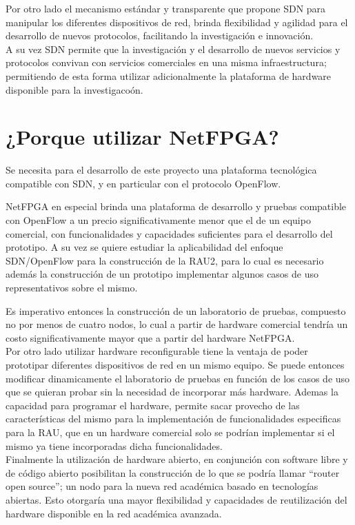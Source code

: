 Por otro lado el mecanismo estándar y transparente que propone SDN para manipular los diferentes dispositivos de red, brinda flexibilidad y agilidad para el desarrollo de nuevos protocolos, facilitando la investigaci\'on e innovaci\'on.\\

A su vez SDN permite que la investigaci\'on y el desarrollo de nuevos servicios y protocolos convivan con servicios comerciales en una misma infraestructura; permitiendo de esta forma utilizar adicionalmente la plataforma de hardware disponible para la investigaco\'on. 


\section[¿Porque utilizar NetFPGA?]{¿Porque utilizar NetFPGA?}

Se necesita para el desarrollo de este proyecto una plataforma tecnol\'ogica compatible con SDN, y en particular con el protocolo OpenFlow.

NetFPGA en especial brinda una plataforma de desarrollo y pruebas compatible con OpenFlow a un precio significativamente menor que el de un equipo comercial, con funcionalidades y capacidades suficientes para el desarrollo del prototipo. A su vez se quiere estudiar la aplicabilidad del enfoque SDN/OpenFlow para la construcción de la RAU2, para lo cual es necesario adem\'as la construcción de un prototipo implementar algunos casos de uso representativos sobre el mismo. 

Es imperativo entonces la construcción de un laboratorio de pruebas, compuesto no por menos de cuatro nodos, lo cual a partir de hardware comercial tendría un costo significativamente mayor que a partir del hardware NetFPGA.\\

Por otro lado utilizar hardware reconfigurable tiene la ventaja de poder prototipar diferentes dispositivos de red en un mismo equipo. Se puede entonces modificar dinamicamente el laboratorio de pruebas en función de los casos de uso que se quieran probar sin la necesidad de incorporar m\'as hardware. Ademas la capacidad para programar el hardware, permite sacar provecho de las características del mismo para la implementaci\'on de funcionalidades especificas para la RAU, que en un hardware comercial solo se podrían implementar si el mismo ya tiene incorporadas dicha funcionalidades.\\

Finalmente la utilizaci\'on de hardware abierto, en conjunci\'on con software libre y de código abierto posibilitan la construcci\'on de lo que se podría llamar “router open source”; un nodo para la nueva red académica basado en tecnologías abiertas. Esto otorgaría una mayor flexibilidad y capacidades de reutilizaci\'on del hardware disponible en la red académica avanzada.

